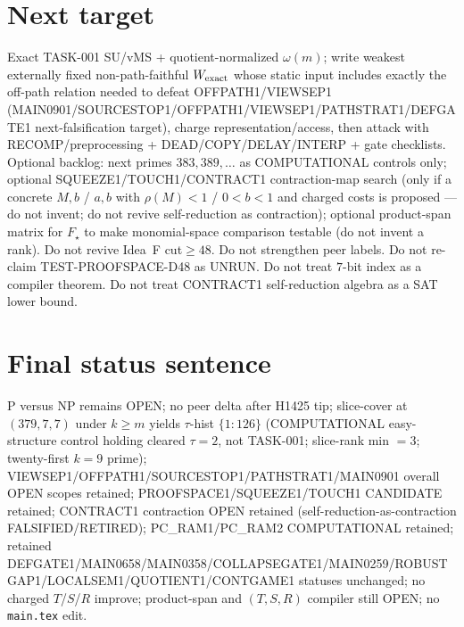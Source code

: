\documentclass[11pt]{article}
\begin{document}
\section*{Next target}
Exact TASK-001 SU/vMS + quotient-normalized $\omega(m)$; write weakest externally fixed non-path-faithful
$W_{\rm exact}$ whose static input includes exactly the off-path relation needed to defeat OFFPATH1/VIEWSEP1
(MAIN0901/SOURCESTOP1/OFFPATH1/VIEWSEP1/PATHSTRAT1/DEFGATE1 next-falsification target), charge representation/access,
then attack with RECOMP/preprocessing + DEAD/COPY/DELAY/INTERP + gate checklists.
Optional backlog: next primes $383,389,\ldots$ as COMPUTATIONAL controls only;
optional SQUEEZE1/TOUCH1/CONTRACT1 contraction-map search (only if a concrete $M,b$ / $a,b$ with $\rho(M){<}1$ / $0{<}b{<}1$ and charged costs is proposed --- do not invent; do not revive self-reduction as contraction);
optional product-span matrix for $F_\star$ to make monomial-space comparison testable (do not invent a rank).
Do not revive Idea~F cut$\ge48$. Do not strengthen peer labels.
Do not re-claim TEST-PROOFSPACE-D48 as UNRUN.
Do not treat $7$-bit index as a compiler theorem.
Do not treat CONTRACT1 self-reduction algebra as a SAT lower bound.

\section*{Final status sentence}
P versus NP remains OPEN; no peer delta after H1425 tip; slice-cover at $(379,7,7)$ under $k{\ge}m$ yields $\tau$-hist $\{1{:}126\}$ (COMPUTATIONAL easy-structure control holding cleared $\tau{=}2$, not TASK-001; slice-rank min $=3$; twenty-first $k{=}9$ prime); VIEWSEP1/OFFPATH1/SOURCESTOP1/PATHSTRAT1/MAIN0901 overall OPEN scopes retained; PROOFSPACE1/SQUEEZE1/TOUCH1 CANDIDATE retained; CONTRACT1 contraction OPEN retained (self-reduction-as-contraction FALSIFIED/RETIRED); PC\_RAM1/PC\_RAM2 COMPUTATIONAL retained; retained DEFGATE1/MAIN0658/MAIN0358/COLLAPSEGATE1/MAIN0259/ROBUSTGAP1/LOCALSEM1/QUOTIENT1/CONTGAME1 statuses unchanged; no charged $T$/$S$/$R$ improve; product-span and $(T,S,R)$ compiler still OPEN; no \texttt{main.tex} edit.
\end{document}
